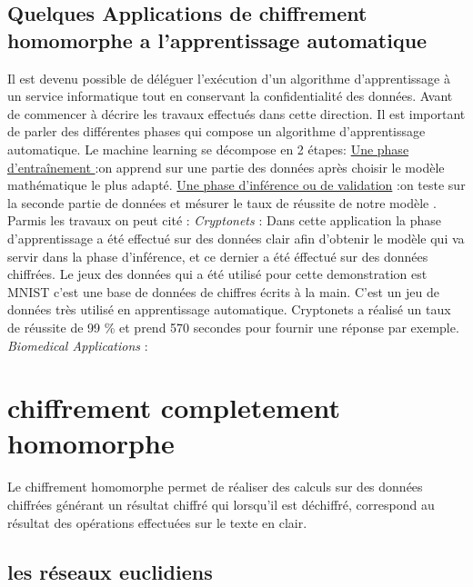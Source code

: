 \documentclass[a4paper,11pt]{report}
\begin{document}
\subsection{Quelques Applications de chiffrement homomorphe a l'apprentissage automatique}
Il est devenu possible de déléguer l'exécution d'un algorithme d'apprentissage à un service informatique tout en conservant la confidentialité des données. \newline
Avant de commencer à décrire les travaux effectués dans cette direction. Il est important de parler des différentes phases qui compose un algorithme d'apprentissage automatique.\newline
Le machine learning se décompose en 2 étapes:\newline
\underline{Une phase d’entraînement }:\newline on apprend sur une partie des données après choisir le modèle mathématique le plus adapté.\newline 
\underline{Une phase d'inférence ou de validation} :\newline	 on teste sur la seconde partie de données et mésurer le taux de réussite de notre modèle .\newline
Parmis les travaux on peut cité :\newline
\textit{Cryptonets } :  \newline
Dans cette application la phase d'apprentissage a été effectué sur des données clair  afin d'obtenir le modèle qui va servir dans la phase d'inférence, et ce dernier a été éffectué sur des données chiffrées.\newline
Le jeux des données qui a été utilisé pour cette demonstration est MNIST c'est une base de données de chiffres écrits à la main. C'est un jeu de données très utilisé en apprentissage automatique.\newline
Cryptonets a réalisé un taux de réussite de 99 \% et prend 570 secondes pour fournir une réponse par exemple.\newline
\textit{Biomedical Applications } :
\newpage
\section{chiffrement completement homomorphe}
Le chiffrement homomorphe permet de réaliser des calculs sur des données chiffrées générant un résultat chiffré qui lorsqu'il est déchiffré, correspond au résultat des opérations effectuées sur le texte en clair. 
\subsection*{les réseaux euclidiens}
\end{document}
